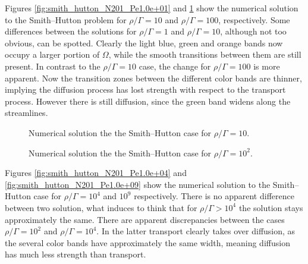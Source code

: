 \clearpage
Figures \ref{fig:smith_hutton_N201_Pe1.0e+01} and
\ref{fig:smith_hutton_N201_Pe1.0e+02} show the numerical solution to the
Smith--Hutton problem for $\rho / \Gamma = 10$ and $\rho / \Gamma = 100$,
respectively. Some differences between the solutions for $\rho / \Gamma = 1$ and
$\rho / \Gamma = 10$, although not too obvious, can be spotted. Clearly the
light blue, green and orange bands now occupy a larger portion of $\Omega$,
while the smooth transitions between them are still present. In contrast to the
$\rho / \Gamma = 10$ case, the change for $\rho / \Gamma = 100$ is more
apparent. Now the transition zones between the different color bands are
thinner, implying the diffusion process has lost strength with respect to the
transport process. However there is still diffusion, since the green band widens
along the streamlines.

\begin{figure}[ht]
	\centering
	
	\caption{Numerical solution the the Smith--Hutton case for $\rho / \Gamma = 10$.}
	\label{fig:smith_hutton_N201_Pe1.0e+01}
	\vspace{1cm}
	
	\caption{Numerical solution the the Smith--Hutton case for $\rho / \Gamma = 10^2$.}
	\label{fig:smith_hutton_N201_Pe1.0e+02}
\end{figure}

% 	

% 	


\clearpage
Figures \ref{fig:smith_hutton_N201_Pe1.0e+04} and
\ref{fig:smith_hutton_N201_Pe1.0e+09} show the numerical solution to the
Smith--Hutton case for $\rho / \Gamma = 10^4$ and $10^9$ respectively. There is
no apparent difference between two solution, what induces to think that for
$\rho / \Gamma > 10^4$ the solution stays approximately the same. There are
apparent discrepancies between the cases $\rho / \Gamma = 10^2$ and $\rho /
\Gamma = 10^4$. In the latter transport clearly takes over diffusion, as the
several color bands have approximately the same width, meaning diffusion has
much less strength than transport. 

